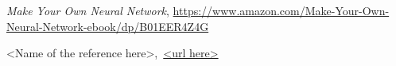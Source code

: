 \cleardoublepage
{}
\begin{thebibliography}{99}

	\textit{Make Your Own Neural Network},
	\url{https://www.amazon.com/Make-Your-Own-Neural-Network-ebook/dp/B01EER4Z4G}

<Name of the reference here>,\ \url{<url here>}

\end{thebibliography}
